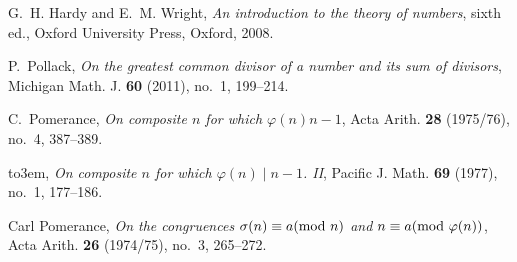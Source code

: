 \documentclass[12pt]{amsart}
\begin{document}
\providecommand{\bysame}{\leavevmode\hbox to3em{\hrulefill}\thinspace}
\providecommand{\MR}{\relax\ifhmode\unskip\space\fi MR }
\providecommand{\MRhref}[2]{%
  \href{http://www.ams.org/mathscinet-getitem?mr=#1}{#2}
}
\providecommand{\href}[2]{#2}
\begin{thebibliography}{1}

G.~H. Hardy and E.~M. Wright, \emph{An introduction to the theory of numbers},
  sixth ed., Oxford University Press, Oxford, 2008.

P.~Pollack, \emph{On the greatest common divisor of a number and its sum of
  divisors}, Michigan Math. J. \textbf{60} (2011), no.~1, 199--214.

C.~Pomerance, \emph{On composite {$n$} for which {$\varphi (n)n-1$}}, Acta
  Arith. \textbf{28} (1975/76), no.~4, 387--389.

\bysame, \emph{On composite {$n$} for which {$\varphi (n)\mid n-1$}. {II}},
  Pacific J. Math. \textbf{69} (1977), no.~1, 177--186.

Carl Pomerance, \emph{On the congruences {$\sigma (n)\equiv a({\rm mod}\ n)$}
  and {$n\equiv a({\rm mod}\ \varphi (n))$}}, Acta Arith. \textbf{26}
  (1974/75), no.~3, 265--272.

\end{thebibliography}
\end{document}
